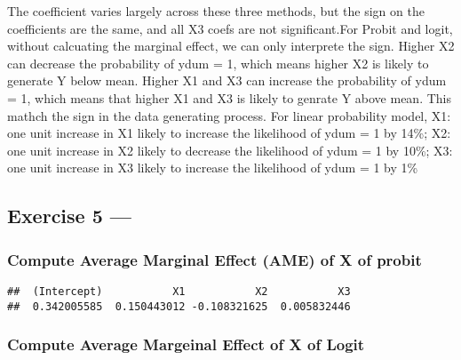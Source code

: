 \documentclass[]{article}
\newenvironment{Shaded}{\begin{snugshade}}{\end{snugshade}}
\newcommand{\KeywordTok}[1]{\textcolor[rgb]{0.13,0.29,0.53}{\textbf{#1}}}
\newcommand{\StringTok}[1]{\textcolor[rgb]{0.31,0.60,0.02}{#1}}
\newcommand{\CommentTok}[1]{\textcolor[rgb]{0.56,0.35,0.01}{\textit{#1}}}
\newcommand{\ControlFlowTok}[1]{\textcolor[rgb]{0.13,0.29,0.53}{\textbf{#1}}}
\newcommand{\OperatorTok}[1]{\textcolor[rgb]{0.81,0.36,0.00}{\textbf{#1}}}
\newcommand{\NormalTok}[1]{#1}
\begin{document}
The coefficient varies largely across these three methods, but the sign
on the coefficients are the same, and all X3 coefs are not
significant.For Probit and logit, without calcuating the marginal
effect, we can only interprete the sign. Higher X2 can decrease the
probability of ydum = 1, which means higher X2 is likely to generate Y
below mean. Higher X1 and X3 can increase the probability of ydum = 1,
which means that higher X1 and X3 is likely to genrate Y above mean.
This mathch the sign in the data generating process. For linear
probability model, X1: one unit increase in X1 likely to increase the
likelihood of ydum = 1 by 14\%; X2: one unit increase in X2 likely to
decrease the likelihood of ydum = 1 by 10\%; X3: one unit increase in X3
likely to increase the likelihood of ydum = 1 by 1\%

\subsection{Exercise 5 ---}\label{exercise-5}

\subsubsection{Compute Average Marginal Effect (AME) of X of
probit}\label{compute-average-marginal-effect-ame-of-x-of-probit}

\begin{Shaded}
\end{Shaded}

\begin{verbatim}
##  (Intercept)           X1           X2           X3 
##  0.342005585  0.150443012 -0.108321625  0.005832446
\end{verbatim}

\subsubsection{Compute Average Margeinal Effect of X of
Logit}\label{compute-average-margeinal-effect-of-x-of-logit}
\end{document}
